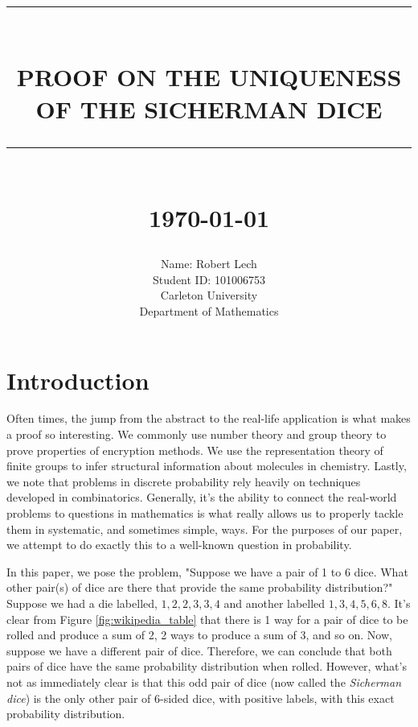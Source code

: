 \documentclass[12pt]{report}
\newcommand{\HRule}[1]{\rule{\linewidth}{#1}}
\begin{document}
\title{ \HRule{0.5pt} \\
		\LARGE \textbf{\uppercase{Proof on the Uniqueness of the Sicherman dice}}
		\HRule{2pt} \\ [0.5cm]
		\normalsize \today \vspace*{5\baselineskip}}

\date{}

\author{
		Name: Robert Lech \\
        Student ID: 101006753 \\ 
		Carleton University \\
		Department of Mathematics }

\maketitle

\sectionfont{\scshape}


\section*{Introduction}
Often times, the jump from the abstract to the real-life application is what makes a proof so interesting. We
commonly use number theory and group theory to prove properties of encryption methods. We use the
representation theory of finite groups to infer structural information about molecules in chemistry. Lastly,
we note that problems in discrete probability rely heavily on techniques developed in combinatorics.
Generally, it's the ability to connect the real-world problems to questions in mathematics is what really
allows us to properly tackle them in systematic, and sometimes simple, ways. For the purposes of our paper, we
attempt to do exactly this to a well-known question in probability.

In this paper, we pose the problem, "Suppose we have a pair of 1 to 6 dice. What other pair(s) of dice are
there that provide the same probability distribution?" Suppose we had a die labelled, $1,2,2,3,3,4$ and
another labelled $1,3,4,5,6,8$. It's clear from Figure \ref{fig:wikipedia_table} that there is 1 way for a
pair of dice to be rolled and produce a sum of 2, 2 ways to produce a sum of 3, and so on. Now, suppose we
have a different pair of dice. Therefore, we can conclude that both pairs of dice have the same probability
distribution when rolled. However, what's not as immediately clear is that this odd pair of dice (now called
the \textit{Sicherman dice}) is the only other pair of 6-sided dice, with positive labels, with this exact
probability distribution.
\end{document}
